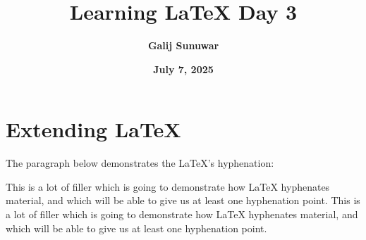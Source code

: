 \documentclass{article}
\title{\textbf{Learning LaTeX Day 3}}
\author{\textbf{Galij Sunuwar}}
\date{\textbf{July 7, 2025}}
\begin{document}
\maketitle

\section{Extending LaTeX}

The paragraph below demonstrates the LaTeX's hyphenation: 

This is a lot of filler which is going to demonstrate how LaTeX hyphenates
material, and which will be able to give us at least one hyphenation point.
This is a lot of filler which is going to demonstrate how LaTeX hyphenates
material, and which will be able to give us 
at least one hyphenation point.
\end{document}
